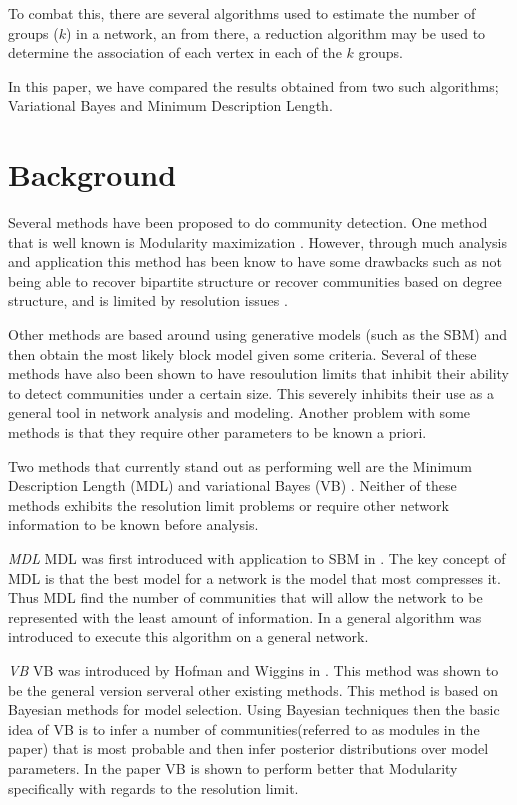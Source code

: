 \documentclass[twocolumn,twoside]{IEEEtran}
\begin{document}
To combat this, there are several algorithms used to estimate the number of groups ($k$)
in a network, an from there, a reduction algorithm may be used to determine the association
of each vertex in each of the $k$ groups.

In this paper, we have compared the results obtained from two such algorithms;
Variational Bayes and Minimum Description Length.

\section*{Background}\label{sec:Background}
Several methods have been proposed to do community detection. One method that is well known is Modularity maximization \cite{Newman2004}. However, through much analysis and application this method has been know to have some drawbacks such as not being able to recover bipartite structure \cite{Peixoto2013} or recover communities based on degree structure, and is limited by resolution issues \cite{fortunato2007resolution}.

Other methods are based around using generative models (such as the SBM) and then obtain the most likely block model given some criteria. Several of these methods have also been shown to have resoulution limits\cite{fortunato2007resolution} that inhibit their ability to detect communities under a certain size. This severely inhibits their use as a general tool in network analysis and modeling. Another problem with some methods is that they require other parameters to be known a priori.

Two methods that currently stand out as performing well are the Minimum Description Length (MDL) \cite{Peixoto2013} and variational Bayes (VB) \cite{Hofman2008}. Neither of these methods exhibits the resolution limit problems or require other network information to be known before analysis.

\emph{MDL}
MDL was first introduced with application to SBM in \cite{Rosvall2007}. The key concept of MDL is that the best model for a network is the model that most compresses it. Thus MDL find the number of communities that will allow the network to be represented with the least amount of information. In \cite{Peixoto2013} a general algorithm was introduced to execute this algorithm on a general network.

\emph{VB}
VB was introduced by Hofman and Wiggins in \cite{Hofman2008}. This method was shown to be the general version serveral other existing methods. This method is based on Bayesian methods for model selection. Using Bayesian techniques then the basic idea of VB is to infer a number of communities(referred to as modules in the paper) that is most probable and then infer posterior distributions over model parameters. In the paper VB is shown to perform better that Modularity specifically with regards to the resolution limit.
\end{document}
